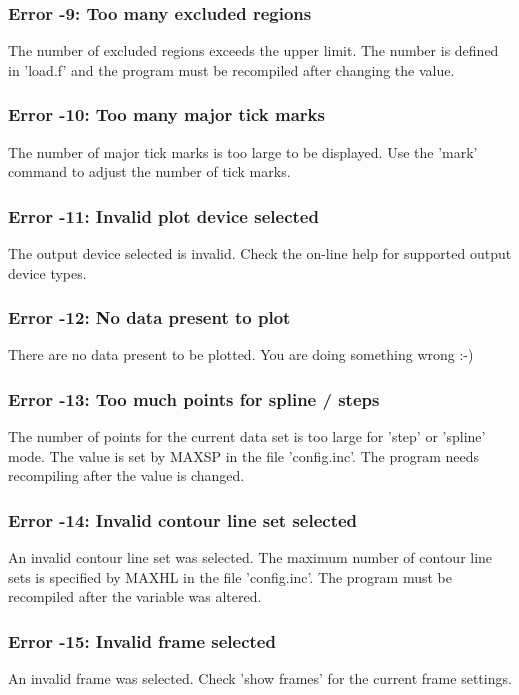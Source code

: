 \subsubsection{Error -9: Too many excluded regions}
\par
The number of excluded regions exceeds the upper limit. The number 
is defined in 'load.f' and the program must be recompiled after 
changing the value. 
\subsubsection{Error -10: Too many major tick marks}
\par
The number of major tick marks is too large to be displayed. Use the 
'mark' command to adjust the number of tick marks. 
\subsubsection{Error -11: Invalid plot device selected}
\par
The output device selected is invalid. Check the on-line help for 
supported output device types. 
\subsubsection{Error -12: No data present to plot}
\par
There are no data present to be plotted. You are doing something 
wrong :-) 
\subsubsection{Error -13: Too much points for spline / steps}
\par
The number of points for the current data set is too large for 
'step' or 'spline' mode. The value is set by MAXSP in the file 
'config.inc'. The program needs recompiling after the value is 
changed. 
\subsubsection{Error -14: Invalid contour line set selected}
\par
An invalid contour line set was selected. The maximum number of 
contour line sets is specified by MAXHL in the file 'config.inc'. 
The program must be recompiled after the variable was altered. 
\subsubsection{Error -15: Invalid frame selected}
\par
An invalid frame was selected. Check 'show frames' for the current 
frame settings. 
